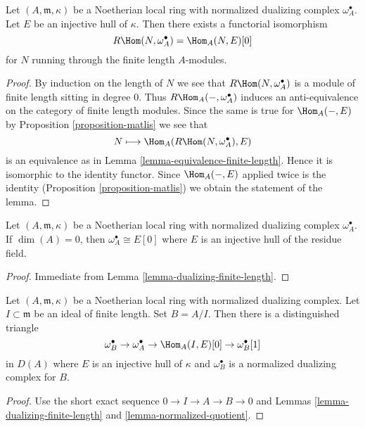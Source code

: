\begin{lemma}
\label{lemma-dualizing-finite-length}
Let $(A, \mathfrak m, \kappa)$ be a Noetherian local
ring with normalized dualizing complex $\omega_A^\bullet$.
Let $E$ be an injective hull of $\kappa$. Then there exists
a functorial isomorphism
$$
R\Hom(N, \omega_A^\bullet) = \Hom_A(N, E)[0]
$$
for $N$ running through the finite length $A$-modules.
\end{lemma}

\begin{proof}
By induction on the length of $N$ we see that $R\Hom(N, \omega_A^\bullet)$
is a module of finite length sitting in degree $0$. Thus
$R\Hom_A(-, \omega_A^\bullet)$ induces an anti-equivalence
on the category of finite length modules. Since the same is true
for $\Hom_A(-, E)$ by Proposition \ref{proposition-matlis} we see that
$$
N \longmapsto \Hom_A(R\Hom(N, \omega_A^\bullet), E)
$$
is an equivalence as in Lemma \ref{lemma-equivalence-finite-length}.
Hence it is isomorphic to the identity functor.
Since $\Hom_A(-, E)$ applied twice is the identity
(Proposition \ref{proposition-matlis}) we obtain
the statement of the lemma.
\end{proof}

\begin{lemma}
\label{lemma-dualizing-artinian}
Let $(A, \mathfrak m, \kappa)$ be a Noetherian local
ring with normalized dualizing complex $\omega_A^\bullet$.
If $\dim(A) = 0$, then $\omega_A^\bullet \cong E[0]$
where $E$ is an injective hull of the residue field.
\end{lemma}

\begin{proof}
Immediate from Lemma \ref{lemma-dualizing-finite-length}.
\end{proof}

\begin{lemma}
\label{lemma-divide-by-finite-length-ideal}
Let $(A, \mathfrak m, \kappa)$ be a Noetherian local
ring with normalized dualizing complex. Let $I \subset \mathfrak m$ be an
ideal of finite length. Set $B = A/I$. Then there is a distinguished
triangle
$$
\omega_B^\bullet \to \omega_A^\bullet \to \Hom_A(I, E)[0] \to
\omega_B^\bullet[1]
$$
in $D(A)$ where $E$ is an injective hull of $\kappa$ and
$\omega_B^\bullet$ is a normalized dualizing complex for $B$.
\end{lemma}

\begin{proof}
Use the short exact sequence $0 \to I \to A \to B \to 0$
and Lemmas \ref{lemma-dualizing-finite-length} and
\ref{lemma-normalized-quotient}.
\end{proof}


